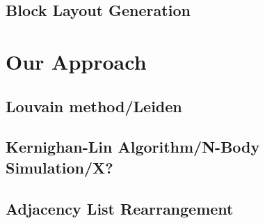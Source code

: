     \subsection{Block Layout Generation}\label{\positionnumber}

\section{Our Approach}\label{\positionnumber}
    \subsection{Louvain method/Leiden}\label{\positionnumber}
    \subsection{Kernighan-Lin Algorithm/N-Body Simulation/X?}\label{\positionnumber}
    \subsection{Adjacency List Rearrangement}\label{\positionnumber}
